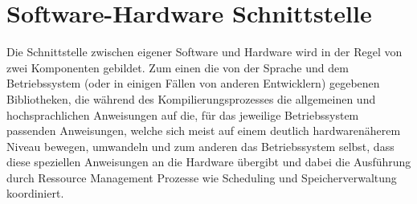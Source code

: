 \section{Software-Hardware Schnittstelle}
Die Schnittstelle zwischen eigener Software und Hardware wird in der Regel von zwei Komponenten gebildet. Zum einen die von der Sprache und dem Betriebssystem (oder in einigen Fällen von anderen Entwicklern) gegebenen Bibliotheken, die während des Kompilierungsprozesses die allgemeinen und hochsprachlichen Anweisungen auf die, für das jeweilige Betriebssystem passenden Anweisungen, welche sich meist auf einem deutlich hardwarenäherem Niveau bewegen, umwandeln und zum anderen das Betriebssystem selbst, dass diese speziellen Anweisungen an die Hardware übergibt und dabei die Ausführung durch Ressource Management Prozesse wie Scheduling und Speicherverwaltung koordiniert.

